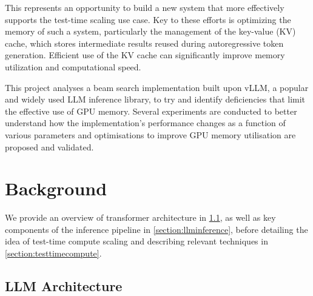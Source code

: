 \documentclass[12pt,twoside]{report}
\begin{document}
This represents an opportunity to build a new system that more effectively supports the test-time scaling use case.
Key to these efforts is optimizing the memory of such a system, particularly the management of the key-value (KV) cache, which stores intermediate results reused during autoregressive token generation. 
Efficient use of the KV cache can significantly improve memory utilization and computational speed.

This project analyses a beam search implementation built upon vLLM, a popular and widely used LLM inference library, to try and identify deficiencies that limit the effective use of GPU memory. 
Several experiments are conducted to better understand how the implementation's performance changes as a function of various parameters and optimisations to improve GPU memory utilisation are proposed and validated. 


\chapter{Background} %
We provide an overview of transformer architecture in \ref{section:llmarchitecture}, as well as key components of the inference pipeline in \ref{section:llminference}, before detailing the idea of test-time compute scaling and describing relevant techniques in \ref{section:testtimecompute}.
\section{LLM Architecture}\label{section:llmarchitecture}
\end{document}
